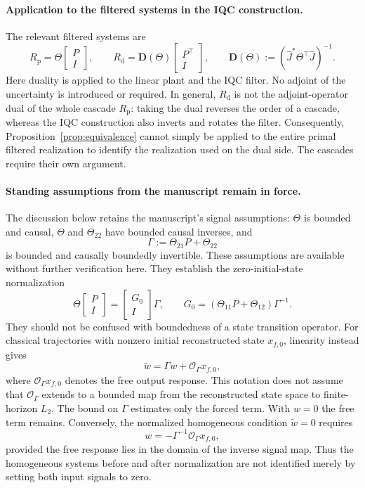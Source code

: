 \documentclass[11pt,a4paper]{article}
\begin{document}
\paragraph{Application to the filtered systems in the IQC construction.}
The relevant filtered systems are
\[
 R_{\mathrm p}=\Theta\begin{bmatrix}P\\I\end{bmatrix},
 \qquad
 R_{\mathrm d}=\mathbf D(\Theta)
                  \begin{bmatrix}P^\top\\I\end{bmatrix},
 \qquad
 \mathbf D(\Theta):=(\widehat J^*\Theta^\top\widehat J)^{-1}.
\]
Here duality is applied to the linear plant and the IQC filter. No adjoint
of the uncertainty is introduced or required. In general,
$R_{\mathrm d}$ is not the adjoint-operator dual of the whole cascade
$R_{\mathrm p}$: taking the dual reverses the order of a cascade,
whereas the IQC construction also inverts and rotates the filter.
Consequently, Proposition~\ref{prop:equivalence} cannot simply be applied
to the entire primal filtered realization to identify the realization
used on the dual side. The cascades require their own argument.

\paragraph{Standing assumptions from the manuscript remain in force.}
The discussion below retains the manuscript's signal assumptions:
$\Theta$ is bounded and causal, $\Theta$ and $\Theta_{22}$ have bounded
causal inverses, and
\[
 \Gamma:=\Theta_{21}P+\Theta_{22}
\]
is bounded and causally boundedly invertible. These assumptions are
available without further verification here. They establish the
zero-initial-state normalization
\[
 \Theta\begin{bmatrix}P\\I\end{bmatrix}
 =\begin{bmatrix}G_0\\I\end{bmatrix}\Gamma,
 \qquad G_0=(\Theta_{11}P+\Theta_{12})\Gamma^{-1}.
\]
They should not be confused with boundedness of a state transition
operator. For classical trajectories with nonzero initial reconstructed
state $x_{f,0}$, linearity instead gives
\[
 \tilde w=\Gamma w+\mathcal O_\Gamma x_{f,0},
\]
where $\mathcal O_\Gamma x_{f,0}$ denotes the free output response.
This notation does not assume that $\mathcal O_\Gamma$ extends to a
bounded map from the reconstructed state space to finite-horizon $L_2$.
The bound on $\Gamma$ estimates only the forced term. With $w=0$ the
free term remains. Conversely, the normalized homogeneous condition
$\tilde w=0$ requires
\[
 w=-\Gamma^{-1}\mathcal O_\Gamma x_{f,0},
\]
provided the free response lies in the domain of the inverse signal map.
Thus the homogeneous systems before and after normalization are not
identified merely by setting both input signals to zero.
\end{document}
